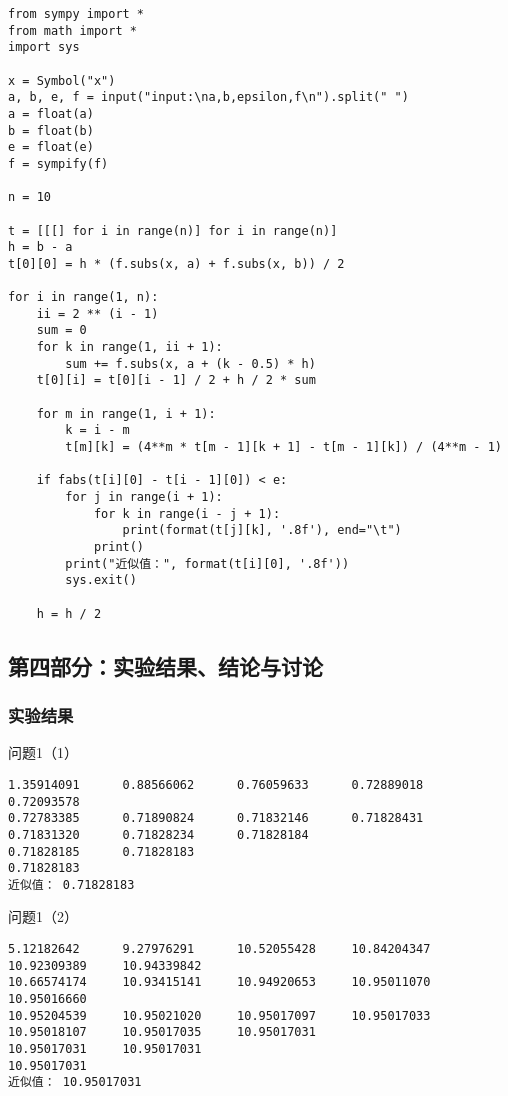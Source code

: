 \documentclass[a4paper,zihao=4,UTF8]{ctexart}
\begin{document}
\begin{lstlisting}
from sympy import *
from math import *
import sys

x = Symbol("x")
a, b, e, f = input("input:\na,b,epsilon,f\n").split(" ")
a = float(a)
b = float(b)
e = float(e)
f = sympify(f)

n = 10

t = [[[] for i in range(n)] for i in range(n)]
h = b - a
t[0][0] = h * (f.subs(x, a) + f.subs(x, b)) / 2

for i in range(1, n):
    ii = 2 ** (i - 1)
    sum = 0
    for k in range(1, ii + 1):
        sum += f.subs(x, a + (k - 0.5) * h)
    t[0][i] = t[0][i - 1] / 2 + h / 2 * sum

    for m in range(1, i + 1):
        k = i - m
        t[m][k] = (4**m * t[m - 1][k + 1] - t[m - 1][k]) / (4**m - 1)

    if fabs(t[i][0] - t[i - 1][0]) < e:
        for j in range(i + 1):
            for k in range(i - j + 1):
                print(format(t[j][k], '.8f'), end="\t")
            print()
        print("近似值：", format(t[i][0], '.8f'))
        sys.exit()

    h = h / 2
\end{lstlisting}

\newpage

\subsection*{第四部分：实验结果、结论与讨论}

\subsubsection*{实验结果}

问题1（1）

\begin{lstlisting}
1.35914091      0.88566062      0.76059633      0.72889018      0.72093578
0.72783385      0.71890824      0.71832146      0.71828431
0.71831320      0.71828234      0.71828184
0.71828185      0.71828183
0.71828183
近似值： 0.71828183
\end{lstlisting}

问题1（2）

\begin{lstlisting}
5.12182642      9.27976291      10.52055428     10.84204347     10.92309389     10.94339842
10.66574174     10.93415141     10.94920653     10.95011070     10.95016660
10.95204539     10.95021020     10.95017097     10.95017033
10.95018107     10.95017035     10.95017031
10.95017031     10.95017031
10.95017031
近似值： 10.95017031
\end{lstlisting}
\end{document}

